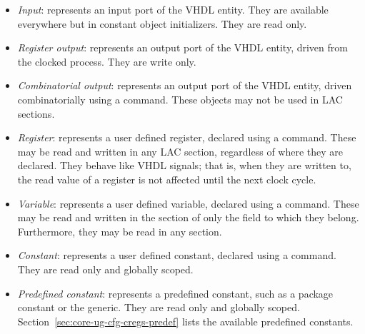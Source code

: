 \begin{itemize}

\item \emph{Input}: represents an input port of the VHDL entity. They are 
available everywhere but in constant object initializers. They are read only.

\item \emph{Register output}: represents an output port of the VHDL entity,
driven from the clocked process. They are write only.

\item \emph{Combinatorial output}: represents an output port of the VHDL entity,
driven combinatorially using a \code{\connect} command. These objects may not
be used in LAC sections.

\item \emph{Register}: represents a user defined register, declared using a
\code{\declRegister} command. These may be read and written in any LAC section,
regardless of where they are declared. They behave like VHDL signals; that is,
when they are written to, the read value of a register is not affected until the
next clock cycle.

\item \emph{Variable}: represents a user defined variable, declared using a
\code{\declVariable} command. These may be read and written in the
\code{\implementation} section of only the field to which they belong.
Furthermore, they may be read in any \code{\finally} section.

\item \emph{Constant}: represents a user defined constant, declared using a
\code{\declConstant} command. They are read only and globally scoped.

\item \emph{Predefined constant}: represents a predefined constant, such as a
package constant or the  generic. They are read only and globally
scoped. Section~\ref{sec:core-ug-cfg-cregs-predef} lists the available
predefined constants.

\end{itemize}

